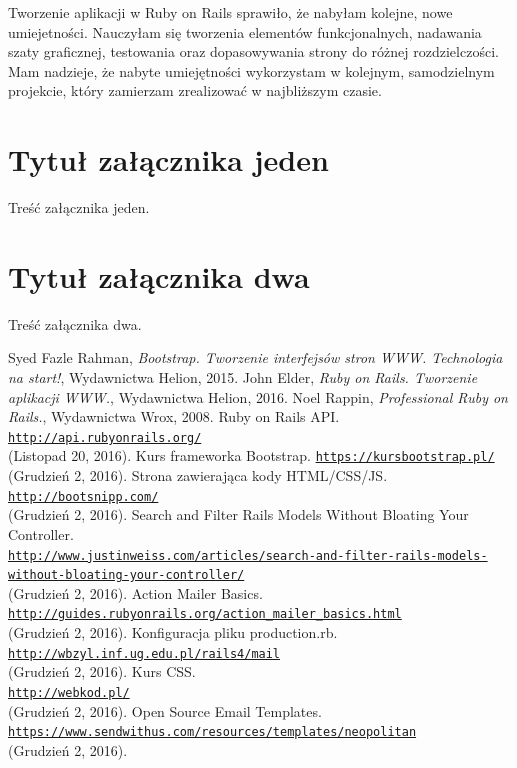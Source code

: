\documentclass[openright]{xmgr}
\begin{document}
	
	\summary
	Tworzenie aplikacji w Ruby on Rails sprawiło, że nabyłam kolejne, nowe umiejetności.  Nauczyłam się tworzenia elementów funkcjonalnych, nadawania szaty graficznej, testowania oraz dopasowywania strony do różnej rozdzielczości. Mam nadzieje, że nabyte umiejętności wykorzystam w kolejnym, samodzielnym projekcie, który zamierzam zrealizować w najbliższym czasie.   
	
	\appendix
	\chapter{Tytuł załącznika jeden}
	
	Treść załącznika jeden.
	
	\chapter{Tytuł załącznika dwa}
	
	Treść załącznika dwa.
	
	\begin{thebibliography}{11}
		 Syed Fazle Rahman, \emph{Bootstrap. Tworzenie interfejsów stron WWW. Technologia na start!}, Wydawnictwa Helion, 2015.
		 John Elder, \emph{Ruby on Rails. Tworzenie aplikacji WWW.}, Wydawnictwa Helion, 2016.
		 Noel Rappin, \emph{Professional Ruby on Rails.}, Wydawnictwa Wrox, 2008.
		Ruby on Rails API. \texttt{\url{http://api.rubyonrails.org/}} \\(Listopad 20, 2016).
		Kurs frameworka Bootstrap. \texttt{\url{https://kursbootstrap.pl/}} \\(Grudzień 2, 2016).
		Strona zawierająca kody HTML/CSS/JS. \texttt{\url{http://bootsnipp.com/}} \\(Grudzień 2, 2016).
		Search and Filter Rails Models Without Bloating Your Controller. \\\texttt{\url{http://www.justinweiss.com/articles/search-and-filter-rails-models-without-bloating-your-controller/}} \\(Grudzień 2, 2016).
		Action Mailer Basics. \\\texttt{\url{http://guides.rubyonrails.org/action_mailer_basics.html}} \\(Grudzień 2, 2016).
		Konfiguracja pliku production.rb. \\\texttt{\url{http://wbzyl.inf.ug.edu.pl/rails4/mail}} \\(Grudzień 2, 2016).
		Kurs CSS. \\\texttt{\url{http://webkod.pl/}} \\(Grudzień 2, 2016).
		Open Source Email Templates. \\\texttt{\url{https://www.sendwithus.com/resources/templates/neopolitan}} \\(Grudzień 2, 2016).
	\end{thebibliography}
	\listoffigures
	
	\lstlistoflistings
	
	\listoftables
	
	\oswiadczenie
	
\end{document}
